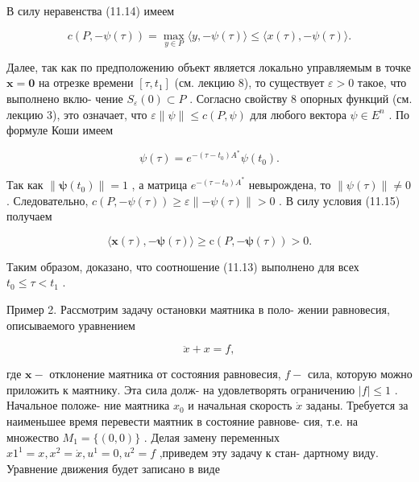 \documentclass[8pt]{extarticle}
\begin{document}
В силу неравенства (11.14) имеем

\[
c\left( {P, - \psi \left( \tau \right) }\right)  = \mathop{\max }\limits_{{y \in  P}}\langle y, - \psi \left( \tau \right) \rangle  \leq  \langle x\left( \tau \right) , - \psi \left( \tau \right) \rangle . \tag{11.15}
\]

Далее, так как по предположению объект является локально управляемым в точке \(\mathbf{x} = \mathbf{0}\) на отрезке времени \(\left\lbrack  {\tau ,{t}_{1}}\right\rbrack\) (см. лекцию 8), то существует \(\varepsilon  > 0\) такое, что выполнено вклю- чение \({S}_{\varepsilon }\left( 0\right)  \subset  P\) . Согласно свойству 8 опорных функций (см. лекцию 3), это означает, что \(\varepsilon \parallel \psi \parallel  \leq  c\left( {P,\psi }\right)\) для любого вектора \(\psi  \in  {E}^{n}\) . По формуле Коши имеем

\[
\psi \left( \tau \right)  = {e}^{-\left( {\tau  - {t}_{0}}\right) {A}^{ * }}\psi \left( {t}_{0}\right) .
\]

Так как \(\parallel \mathbf{\psi }\left( {t}_{0}\right) \parallel  = 1\) , а матрица \({e}^{-\left( {\tau  - {t}_{0}}\right) {A}^{ * }}\) невырождена, то \(\parallel \psi \left( \tau \right) \parallel  \neq  0\) . Следовательно, \(c\left( {P, - \psi \left( \tau \right) }\right)  \geq  \varepsilon \parallel  - \psi \left( \tau \right) \parallel  > 0\) . В силу условия (11.15) получаем

\[
\langle \mathbf{x}\left( \tau \right) , - \mathbf{\psi }\left( \tau \right) \rangle  \geq  \mathrm{c}\left( {P, - \mathbf{\psi }\left( \tau \right) }\right)  > 0.
\]

Таким образом, доказано, что соотношение (11.13) выполнено для всех \({t}_{0} \leq  \tau  < {t}_{1}\) .

Пример 2. Рассмотрим задачу остановки маятника в поло- жении равновесия, описываемого уравнением

\[
\ddot{x} + x = f,
\]

где \(\mathbf{x} -\) отклонение маятника от состояния равновесия, \(f -\) сила, которую можно приложить к маятнику. Эта сила долж- на удовлетворять ограничению \(\left| f\right|  \leq  1\) . Начальное положе- ние маятника \({x}_{0}\) и начальная скорость \(\dot{x}\) заданы. Требуется за наименьшее время перевести маятник в состояние равнове- сия, т.е. на множество \({M}_{1} = \{ \left( {0,0}\right) \}\) . Делая замену переменных \(x{1}^{1} = x,{x}^{2} = \dot{x},{u}^{1} = 0,{u}^{2} = f\) ,приведем эту задачу к стан- дартному виду. Уравнение движения будет записано в виде
\end{document}
